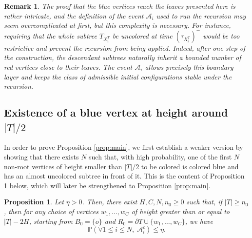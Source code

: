 \documentclass[french]{article}
\newtheorem{prop}[theorem]{Proposition}
\newtheorem{remark}[theorem]{Remark}
\renewcommand{\P}{\mathbb{P}}
\newcommand{\Tf}{T}
\renewcommand{\1}{\mathds{1}}
\begin{document}
\begin{remark} 
    The proof that the blue vertices reach the leaves presented here is rather intricate, and the definition of the event $\mathcal{A}_i$ used to run the recursion may seem overcomplicated at first, but this complexity is necessary. For instance, requiring that the whole subtree $\Tf_{X_i^{\Tf}}$ be uncolored at time $(\tau_{X_i^{\Tf}})^-$ would be too restrictive and prevent the recursion from being applied. Indeed, after one step of the construction, the descendant subtrees naturally inherit a bounded number of red vertices close to their leaves. The event $\mathcal{A}_i$ allows precisely this boundary layer and keeps the class of admissible initial configurations stable under the recursion.
\end{remark}

\subsection{Existence of a blue vertex at height around $|\Tf|/2$}

In order to prove Proposition \ref{prop:main}, we first establish a weaker version by showing that there exists $N$ such that, with high probability, one of the first $N$ non-root vertices of height smaller than $|\Tf|/2$ to be colored is colored blue and has an almost uncolored subtree in front of it. This is the content of Proposition \ref{prop:unsommetvide} below, which will later be strengthened to Proposition \ref{prop:main}.


\begin{prop}\label{prop:unsommetvide} Let $\eta>0$. Then, there exist $H,C,N,n_0\ge 0$ such that, if $|\Tf|\ge n_0$, then for any choice of vertices $w_1,\ldots,w_C$ of height greater than or equal to $|\Tf|-2H$, starting from $B_0=\{o\}$ and $R_0=\partial \Tf \cup\{w_1,\ldots,w_C\}$, we have
\begin{equation*}
 \P(\forall 1\le i\le N,\; \mathcal{A}_i^c)\le \eta.
\end{equation*}
\end{prop}
\end{document}
